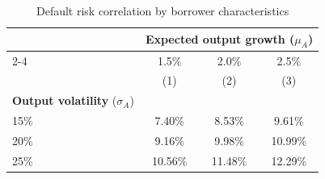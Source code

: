 \begin{table}[h]
\small
\centering
\caption{Default risk correlation by borrower characteristics}
\label{tab:table_corr_by_characteristics}
\begin{tabular*}{0.8\textwidth}{@{\extracolsep{\fill}}lccc}
\toprule
 & \multicolumn{3}{c}{\textbf{Expected output growth} ($\mu_A$)} \\
\cmidrule{2-4}
 & 1.5\% & 2.0\% & 2.5\% \\
 \addlinespace
 & (1) & (2) & (3) \\
\midrule
\textbf{Output volatility} ($\sigma_A$) & & & \\
\multicolumn{1}{l}{15\%} & 7.40\% & 8.53\% & 9.61\% \\
\multicolumn{1}{l}{20\%} & 9.16\% & 9.98\% & 10.99\% \\
\multicolumn{1}{l}{25\%} & 10.56\% & 11.48\% & 12.29\% \\
\bottomrule
\end{tabular*}
\end{table}
